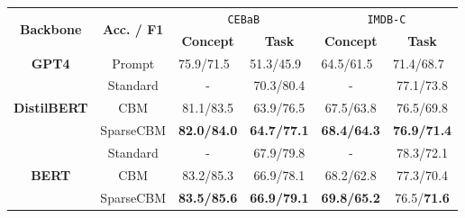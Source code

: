 \documentclass[letterpaper]{article} %
\begin{document}
\begin{table}[t]
\centering
\setlength{\tabcolsep}{1pt} %
\fontsize{9pt}{9.5pt}\selectfont
\begin{tabular}{cccccc}
\toprule
\multirow{2}{*}{\textbf{Backbone}}   & \multirow{2}{*}{\textbf{Acc. / F1}} & \multicolumn{2}{c}{\texttt{CEBaB}}                                & \multicolumn{2}{c}{\texttt{IMDB-C}}                                 \\ \cline{3-6}
                                     &                                     & \textbf{Concept}                & \textbf{Task}                   & \textbf{Concept}                & \textbf{Task}                   \\ \midrule
\textbf{GPT4}                        & Prompt                           & \multicolumn{1}{l}{75.9/71.5} & \multicolumn{1}{l}{51.3/45.9} & \multicolumn{1}{l}{64.5/61.5} & \multicolumn{1}{l}{71.4/68.7} \\ \midrule
\multirow{3}{*}{\textbf{DistilBERT}} & Standard                            & -                               & 70.3/80.4                     & -                               &     77.1/73.8                           \\
                                     & CBM                                 & 81.1/83.5                     &  63.9/76.5                     &        67.5/63.8                         & 76.5/69.8                                \\
                                     & SparseCBM                           & \textbf{82.0/84.0}            & \textbf{64.7/77.1}            &     \textbf{68.4/64.3}                            &    \textbf{76.9/71.4}                             \\ \midrule
\multirow{3}{*}{\textbf{BERT}}       & Standard                            & -                               & 67.9/79.8                     & -                               &  78.3/72.1                               \\
                                     & CBM                                 & 83.2/85.3                     & 66.9/78.1                     &   68.2/62.8                              &    77.3/70.4                             \\
                                     & SparseCBM                           & \textbf{83.5/85.6}            & \textbf{66.9/79.1}            &    \textbf{69.8/65.2}                             &    76.5/\textbf{71.6}                             \\ \midrule

\end{tabular}
\end{table}
\end{document}
